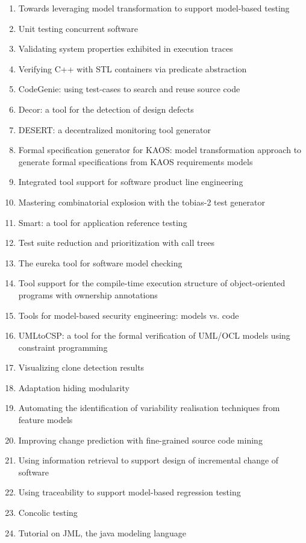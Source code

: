 \begin{enumerate}[itemsep=-1ex]
  \item Towards leveraging model transformation to support model-based testing
  \item Unit testing concurrent software
  \item Validating system properties exhibited in execution traces
  \item Verifying C++ with STL containers via predicate abstraction
  \item CodeGenie: using test-cases to search and reuse source code
  \item Decor: a tool for the detection of design defects
  \item DESERT: a decentralized monitoring tool generator
  \item Formal specification generator for KAOS: model transformation approach to generate formal specifications from KAOS requirements models
  \item Integrated tool support for software product line engineering
  \item Mastering combinatorial explosion with the tobias-2 test generator
  \item Smart: a tool for application reference testing
  \item Test suite reduction and prioritization with call trees
  \item The eureka tool for software model checking
  \item Tool support for the compile-time execution structure of object-oriented programs with ownership annotations
  \item Tools for model-based security engineering: models vs. code
  \item UMLtoCSP: a tool for the formal verification of UML/OCL models using constraint programming
  \item Visualizing clone detection results
  \item Adaptation hiding modularity
  \item Automating the identification of variability realisation techniques from feature models
  \item Improving change prediction with fine-grained source code mining
  \item Using information retrieval to support design of incremental change of software
  \item Using traceability to support model-based regression testing
  \item Concolic testing
  \item Tutorial on JML, the java modeling language

\end{enumerate}
